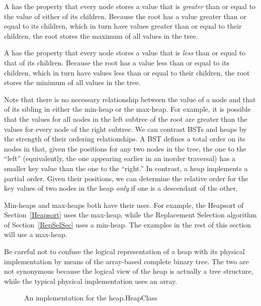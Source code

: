 A  has the property that every node stores a value
that is \emph{greater} than or equal to the value of either of its
children.
Because the root has a value greater than or equal to its children,
which in turn have values greater than or equal to their children, the
root stores the maximum of all values in the tree.

A  has the property that every node stores a value
that is \emph{less}
than or equal to that of its children.
Because the root has a value less than or equal to its children, which
in turn have values less than or equal to their children, the root
stores the minimum of all values in the tree.

Note that there is no necessary relationship between the value of a
node and that of its sibling in either the min-heap or the max-heap.
For example, it is possible that the values for all nodes in the left
subtree of the root are greater than the values for every node of the
right subtree.
We can contrast BSTs and heaps by the strength of their ordering
relationships.
A BST defines a total order on its nodes in that,
given the positions for any two nodes in the tree, the one to the
``left'' (equivalently, the one appearing earlier in an inorder
traversal) has a smaller key value than the one to the ``right.''
In contrast, a heap implements a partial order.
Given their positions, we can determine the relative order for the key
values of two nodes in the heap \emph{only} if one is a descendant of
the other.

Min-heaps and max-heaps both have their uses.
For example, the Heapsort of
Section~\ref{Heapsort} uses the max-heap,
while the Replacement Selection algorithm of Section~\ref{RepSelSec}
uses a min-heap.
The examples in the rest of this section will use a max-heap.

Be careful not to confuse the logical representation of a heap
with its physical implementation by means of the array-based complete
binary tree.
The two are not synonymous because the logical view of the heap is
actually a tree structure, while the typical physical implementation
uses an array.

\begin{figure}
\vspace{-\bigskipamount}
{An implementation for the heap.}{HeapClass}
\vspace{-\smallskipamount}
\end{figure}

